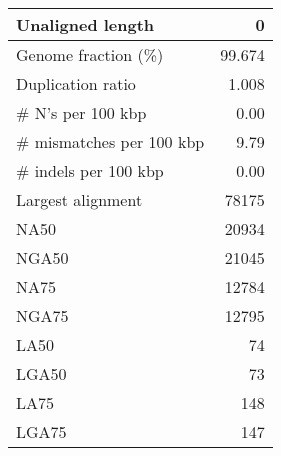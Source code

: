 \documentclass[12pt,a4paper]{article}
\begin{document}
\begin{table}[ht]
\begin{center}
\begin{tabular}{|l*{1}{|r}|}
Unaligned length & 0 \\ \hline
Genome fraction (\%) & 99.674 \\ \hline
Duplication ratio & 1.008 \\ \hline
\# N's per 100 kbp & 0.00 \\ \hline
\# mismatches per 100 kbp & 9.79 \\ \hline
\# indels per 100 kbp & 0.00 \\ \hline
Largest alignment & 78175 \\ \hline
NA50 & 20934 \\ \hline
NGA50 & 21045 \\ \hline
NA75 & 12784 \\ \hline
NGA75 & 12795 \\ \hline
LA50 & 74 \\ \hline
LGA50 & 73 \\ \hline
LA75 & 148 \\ \hline
LGA75 & 147 \\ \hline
\end{tabular}
\end{center}
\end{table}
\end{document}
